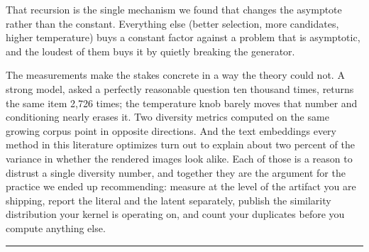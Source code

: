 \documentclass[
  11pt,
]{article}
\theoremstyle{plain}
\theoremstyle{definition}
\begin{document}
That recursion is the single mechanism we found that changes the
asymptote rather than the constant. Everything else (better selection,
more candidates, higher temperature) buys a constant factor against a
problem that is asymptotic, and the loudest of them buys it by quietly
breaking the generator.

The measurements make the stakes concrete in a way the theory could not.
A strong model, asked a perfectly reasonable question ten thousand
times, returns the same item 2,726 times; the temperature knob barely
moves that number and conditioning nearly erases it. Two diversity
metrics computed on the same growing corpus point in opposite
directions. And the text embeddings every method in this literature
optimizes turn out to explain about two percent of the variance in
whether the rendered images look alike. Each of those is a reason to
distrust a single diversity number, and together they are the argument
for the practice we ended up recommending: measure at the level of the
artifact you are shipping, report the literal and the latent separately,
publish the similarity distribution your kernel is operating on, and
count your duplicates before you compute anything else.

\begin{center}\rule{0.5\linewidth}{0.5pt}\end{center}
\end{document}
